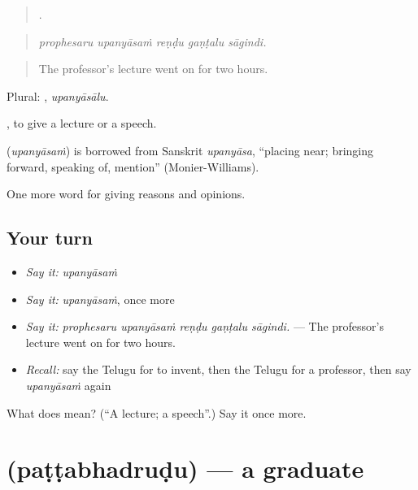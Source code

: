 \begin{quote}
    .
\end{quote}

\begin{quote}
\emph{prophesaru upanyāsaṁ reṇḍu gaṇṭalu sāgindi.}
\end{quote}

\begin{quote}
The professor’s lecture went on for two hours.
\end{quote}

Plural: , \emph{upanyāsālu}.

 , to give a lecture or a speech.

\begin{cousinweb}
\textbf{} (\emph{upanyāsaṁ}) is borrowed from Sanskrit \emph{upanyāsa}, \textquotedblleft{}placing near; bringing forward, speaking of, mention\textquotedblright{} (Monier-Williams).
\end{cousinweb}

\begin{grammarlens}[title={What you've built}]
One more word for giving reasons and opinions.
\end{grammarlens}

\subsection*{Your turn}
\begin{itemize}
\raggedright
  \item \emph{Say it:} \emph{upanyāsaṁ}
  \item \emph{Say it:} \emph{upanyāsaṁ}, once more
  \item \emph{Say it:} \emph{prophesaru upanyāsaṁ reṇḍu gaṇṭalu sāgindi.} — The professor’s lecture went on for two hours.
  \item \emph{Recall:} say the Telugu for to invent, then the Telugu for a professor, then say \emph{upanyāsaṁ} again
\end{itemize}

\begin{tcolorbox}[breakable,colback=teal!4,colframe=teal!35!black,title={Before you move on}]
What does  mean? (\textquotedblleft{}A lecture; a speech\textquotedblright{}.) Say it once more.
\end{tcolorbox}
\section[\texorpdfstring{\te{పట్టభద్రుడు} (paṭṭabhadruḍu)}{పట్టభద్రుడు (paṭṭabhadruḍu)}]{ (paṭṭabhadruḍu) — a graduate}

